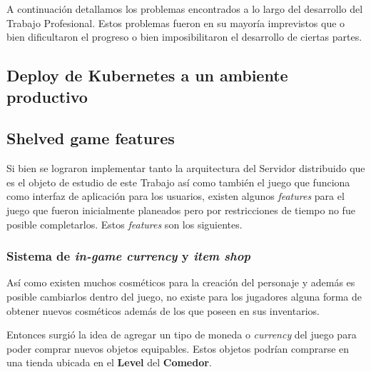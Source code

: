 
\noindent A continuación detallamos los problemas encontrados a lo largo del desarrollo del
Trabajo Profesional. Estos problemas fueron en su mayoría imprevistos que o bien
dificultaron el progreso o bien imposibilitaron el desarrollo de ciertas partes.

\subsection{Deploy de Kubernetes a un ambiente productivo}

\subsection{Shelved game features}

Si bien se lograron implementar tanto la arquitectura del Servidor distribuido que es el objeto
de estudio de este Trabajo así como también el juego que funciona como interfaz de aplicación
para los usuarios, existen algunos \textit{features} para el juego que fueron inicialmente
planeados pero por restricciones de tiempo no fue posible completarlos. Estos \textit{features}
son los siguientes.

\subsubsection{Sistema de \textit{in-game currency} y \textit{item shop}}
Así como existen muchos cosméticos para la creación del personaje y además es posible cambiarlos dentro del
juego, no existe para los jugadores alguna forma de obtener nuevos cosméticos además de los que poseen en sus
inventarios.

Entonces surgió la idea de agregar un tipo de moneda o \textit{currency} del juego para poder comprar nuevos
objetos equipables. Estos objetos podrían comprarse en una tienda ubicada en el \textbf{Level} del \textbf{Comedor}.

